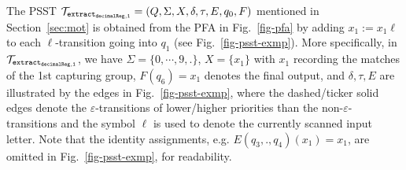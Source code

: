 \begin{example}
The PSST $\mathcal{T}_{\tt extract_{decimalReg,1}}=(Q, \Sigma, X, \delta, \tau, E,  q_{0}, F)$ mentioned in Section~\ref{sec:mot} is obtained from the PFA in Fig.~\ref{fig-pfa} by adding $x_1 := x_1 \ell$ to each $\ell$-transition going into $q_1$ (see Fig.~\ref{fig-psst-exmp}). More specifically, in $\mathcal{T}_{\tt extract_{decimalReg,1}}$, we have $\Sigma = \{0,\cdots,9, .\}$, $X= \{x_1\}$ with $x_1$ recording the matches of the 1st capturing group, $F(q_{6}) = x_1$ denotes the final output, and $\delta, \tau, E$ are illustrated by the edges in Fig.~\ref{fig-psst-exmp}, where the dashed/ticker solid edges denote the $\varepsilon$-transitions of lower/higher priorities than the non-$\varepsilon$-transitions and the symbol $\ell$ is used to denote the currently scanned input letter. Note that the identity assignments, e.g. $E(q_3, ., q_4)(x_1) = x_1$, are omitted in Fig.~\ref{fig-psst-exmp}, for readability.   


\end{example}
